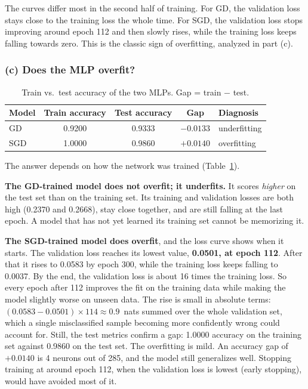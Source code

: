 \documentclass[11pt]{article}
\begin{document}
The curves differ most in the second half of training. For GD, the validation loss stays close to the training loss the whole time. For SGD, the validation loss stops improving around epoch 112 and then slowly rises, while the training loss keeps falling towards zero. This is the classic sign of overfitting, analyzed in part (c).

\FloatBarrier
\subsubsection*{(c) Does the MLP overfit?}

\begin{table}[H]
\centering
\caption{Train vs.\ test accuracy of the two MLPs. Gap = train $-$ test.}
\label{tab:q4c}
\small
\begin{tabular}{lcccl}
\toprule
Model & Train accuracy & Test accuracy & Gap & Diagnosis \\
\midrule
GD  & 0.9200 & 0.9333 & $-0.0133$ & underfitting \\
SGD & 1.0000 & 0.9860 & $+0.0140$ & overfitting \\
\bottomrule
\end{tabular}
\end{table}

The answer depends on how the network was trained (Table~\ref{tab:q4c}).

\textbf{The GD-trained model does not overfit; it underfits.} It scores \emph{higher} on the test set than on the training set. Its training and validation losses are both high (0.2370 and 0.2668), stay close together, and are still falling at the last epoch. A model that has not yet learned its training set cannot be memorizing it.

\textbf{The SGD-trained model does overfit}, and the loss curve shows when it starts. The validation loss reaches its lowest value, \textbf{0.0501, at epoch 112}. After that it rises to 0.0583 by epoch 300, while the training loss keeps falling to 0.0037. By the end, the validation loss is about 16 times the training loss. So every epoch after 112 improves the fit on the training data while making the model slightly worse on unseen data. The rise is small in absolute terms: $(0.0583 - 0.0501) \times 114 \approx 0.9$~nats summed over the whole validation set, which a single misclassified sample becoming more confidently wrong could account for. Still, the test metrics confirm a gap: 1.0000 accuracy on the training set against 0.9860 on the test set.
The overfitting is mild. An accuracy gap of $+0.0140$ is 4 neurons out of 285, and the model still generalizes well. Stopping training at around epoch 112, when the validation loss is lowest (early stopping), would have avoided most of it.
\end{document}
